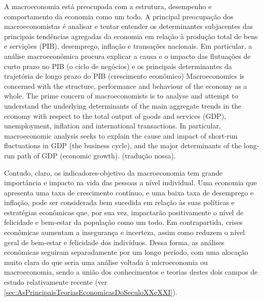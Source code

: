 \citacao
	{%
		A macroeconomia está preocupada com a estrutura, desempenho e comportamento da economia como um todo. A principal preocupação dos macroeconomistas é analisar e tentar entender os determinantes subjacentes das principais tendências agregadas da economia em relação à produção total de bens e servições (PIB), desemprego, inflação e transações nacionais. Em particular, a análise macroeconômica procura explicar a causa e o impacto das flutuações de curto prazo no PIB (o ciclo de negócios) e os principais determinantes da trajetória de longo prazo do PIB (crescimento econômico)
	}{%
		Macroeconomics is concerned with the structure, performance and behaviour of the economy as a whole. The prime concern of macroeconomists is to analyse and attempt to understand the underlying determinants of the main aggregate trends in the economy with respect to the total output of goods and services (GDP), unemployment, inflation and international transactions. In particular, macroeconomic analysis seeks to explain the cause and impact of short-run fluctuations in GDP (the business cycle), and the major determinants of the long-run path of GDP (economic growth).
	}
	{\citep[pg.1]{snowdon_modern_2005}}
	{(tradução nossa).}

Contudo, claro, os indicadores-objetivo da macroeconomia tem grande importância e impacto na vida das pessoas a nível individual. Uma economia que apresenta uma taxa de crescimento contínuo, e uma baixa taxa de desemprego e inflação, pode ser considerada bem sucedida em relação às suas políticas e estratégias econômicas que, por sua vez, impactarão positivamente o nível de felicidade e bem-estar da população como um todo. Em contrapartida, crises econômicas aumentam a insegurança e incerteza, assim como reduzem o nível geral de bem-estar e felicidade dos indivíduos. Dessa forma, as análises econômicas seguiram separadamente por um longo período, com uma alocação muito clara do que seria uma análise voltada à microeconomia ou macroeconomia, sendo a união dos conhecimentos e teorias destes dois campos de estudo relativamente recente (ver \autoref{sec:AsPrincipaisTeoriasEconomicasDoSeculoXXeXXI}).

